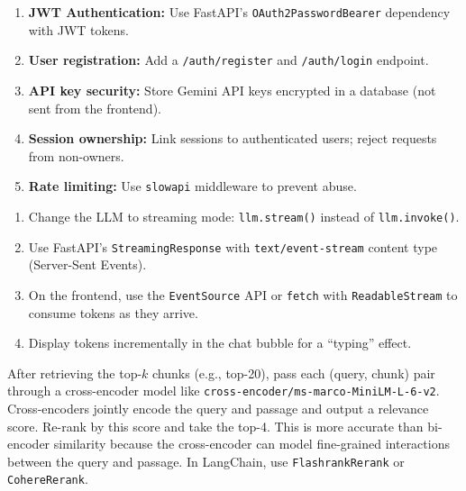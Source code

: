 \documentclass[12pt,a4paper]{article}
\begin{document}
\begin{interviewbox}
\end{interviewbox}
\begin{answerbox}
\begin{enumerate}
  \item \textbf{JWT Authentication:} Use FastAPI's \texttt{OAuth2PasswordBearer} dependency with JWT tokens.
  \item \textbf{User registration:} Add a \texttt{/auth/register} and \texttt{/auth/login} endpoint.
  \item \textbf{API key security:} Store Gemini API keys encrypted in a database (not sent from the frontend).
  \item \textbf{Session ownership:} Link sessions to authenticated users; reject requests from non-owners.
  \item \textbf{Rate limiting:} Use \texttt{slowapi} middleware to prevent abuse.
\end{enumerate}
\end{answerbox}

\begin{interviewbox}
\end{interviewbox}
\begin{answerbox}
\begin{enumerate}
  \item Change the LLM to streaming mode: \texttt{llm.stream()} instead of \texttt{llm.invoke()}.
  \item Use FastAPI's \texttt{StreamingResponse} with \texttt{text/event-stream} content type (Server-Sent Events).
  \item On the frontend, use the \texttt{EventSource} API or \texttt{fetch} with \texttt{ReadableStream} to consume tokens as they arrive.
  \item Display tokens incrementally in the chat bubble for a ``typing'' effect.
\end{enumerate}
\end{answerbox}

\begin{interviewbox}
\end{interviewbox}
\begin{answerbox}
After retrieving the top-$k$ chunks (e.g., top-20), pass each (query, chunk) pair through a cross-encoder model like \texttt{cross-encoder/ms-marco-MiniLM-L-6-v2}. Cross-encoders jointly encode the query and passage and output a relevance score. Re-rank by this score and take the top-4. This is more accurate than bi-encoder similarity because the cross-encoder can model fine-grained interactions between the query and passage. In LangChain, use \texttt{FlashrankRerank} or \texttt{CohereRerank}.
\end{answerbox}
\end{document}
